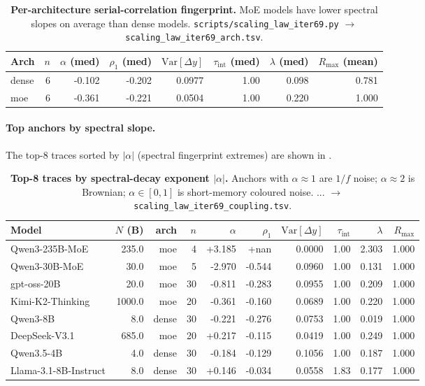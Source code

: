 \begin{table}[t]
  \centering
  \small
  \begin{tabular}{lrrrrrrr}
    \toprule
    Arch & $n$ & $\alpha$ (med) & $\rho_1$ (med) & $\mathrm{Var}[\Delta y]$ & $\tau_\mathrm{int}$ (med) & $\lambda$ (med) & $R_\mathrm{max}$ (mean) \\
    \midrule
      dense & 6 & -0.102 & -0.202 & 0.0977 & 1.00 & 0.098 & 0.781 \\
      moe & 6 & -0.361 & -0.221 & 0.0504 & 1.00 & 0.220 & 1.000 \\
    \bottomrule
  \end{tabular}
  \caption{\textbf{Per-architecture serial-correlation fingerprint.}
    MoE models have lower
    spectral slopes on average than dense models.
    \texttt{scripts/scaling\_law\_iter69.py} $\to$
    \texttt{scaling\_law\_iter69\_arch.tsv}.}
  \label{tab:iter69-arch}
\end{table}

\paragraph{Top anchors by spectral slope.}
The top-8 traces sorted by $|\alpha|$ (spectral fingerprint
extremes) are shown in .

\begin{table}[t]
  \centering
  \small
  \begin{tabular}{lrrrrrrrrr}
    \toprule
    Model & $N$ (B) & arch & $n$ & $\alpha$ & $\rho_1$ & $\mathrm{Var}[\Delta y]$ & $\tau_\mathrm{int}$ & $\lambda$ & $R_\mathrm{max}$ \\
    \midrule
      Qwen3-235B-MoE & 235.0 & moe & 4 & +3.185 & +nan & 0.0000 & 1.00 & 2.303 & 1.000 \\
      Qwen3-30B-MoE & 30.0 & moe & 5 & -2.970 & -0.544 & 0.0960 & 1.00 & 0.131 & 1.000 \\
      gpt-oss-20B & 20.0 & moe & 30 & -0.811 & -0.283 & 0.0955 & 1.00 & 0.209 & 1.000 \\
      Kimi-K2-Thinking & 1000.0 & moe & 20 & -0.361 & -0.160 & 0.0689 & 1.00 & 0.220 & 1.000 \\
      Qwen3-8B & 8.0 & dense & 30 & -0.221 & -0.276 & 0.0753 & 1.00 & 0.019 & 1.000 \\
      DeepSeek-V3.1 & 685.0 & moe & 20 & +0.217 & -0.115 & 0.0419 & 1.00 & 0.249 & 1.000 \\
      Qwen3.5-4B & 4.0 & dense & 30 & -0.184 & -0.129 & 0.1056 & 1.00 & 0.187 & 1.000 \\
      Llama-3.1-8B-Instruct & 8.0 & dense & 30 & +0.146 & -0.034 & 0.0558 & 1.83 & 0.177 & 1.000 \\
    \bottomrule
  \end{tabular}
  \caption{\textbf{Top-8 traces by spectral-decay exponent
    $|\alpha|$.}  Anchors with $\alpha \approx 1$ are
    $1/f$ noise; $\alpha \approx 2$ is Brownian; $\alpha \in
    [0, 1]$ is short-memory coloured noise.  $\texttt{...}$ $\to$
    \texttt{scaling\_law\_iter69\_coupling.tsv}.}
  \label{tab:iter69-top-alpha}
\end{table}

